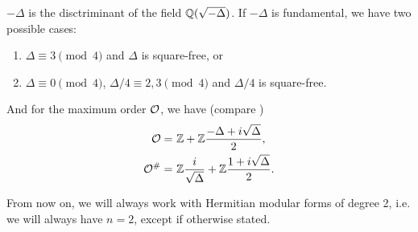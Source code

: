 $-\Delta$ is the disctriminant of the field $\mathbb{Q}(\sqrt{-\Delta})$. If $-\Delta$ is fundamental, we have two possible cases:
\begin{enumerate}
\item $\Delta \equiv 3 \pmod{4}$ and $\Delta$ is square-free, or
\item $\Delta \equiv 0 \pmod{4}$, $\Delta/4 \equiv 2,3 \pmod{4}$ and $\Delta/4$ is square-free.
\end{enumerate}
And for the maximum order $\mathcal{O}$, we have (compare \cite{Dern01Herm})
\begin{align*}
\mathcal{O} = &\ \mathbb{Z} +  \mathbb{Z} \frac{-\Delta+i\sqrt{\Delta}}{2} , \\
\mathcal{O}^\# = & \ \mathbb{Z} \frac{i}{\sqrt{\Delta}} + \mathbb{Z} \frac{1 + i\sqrt{\Delta}}{2} .
\end{align*}

From now on, we will always work with Hermitian modular forms of degree 2, i.e. we will always have $n=2$, except if otherwise stated.

